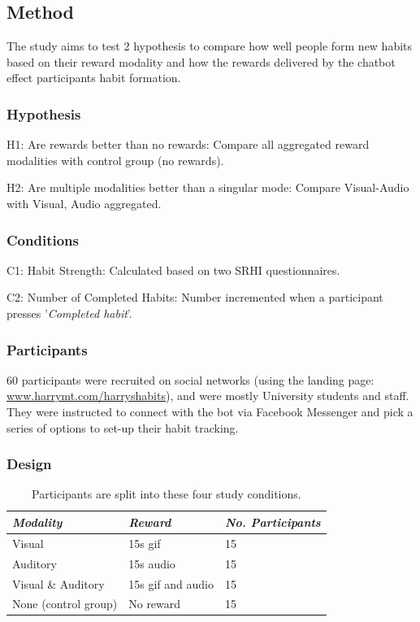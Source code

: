 \documentclass{scaffold/sigchi}
\begin{document}
\subsection{Method}
The study aims to test 2 hypothesis to compare how well people form new habits based on their reward modality and how the rewards delivered by the chatbot effect participants habit formation.

\subsubsection{Hypothesis}
H1: Are rewards better than no rewards: Compare all aggregated reward modalities with control group (no rewards).


H2: Are multiple modalities better than a singular mode: Compare Visual-Audio with Visual, Audio aggregated.

\subsubsection{Conditions}
C1: Habit Strength: Calculated based on two SRHI questionnaires.


C2: Number of Completed Habits: Number incremented when a participant presses '\textit{Completed habit}'.

\subsubsection{Participants}
60 participants were recruited on social networks (using the landing page: \url{www.harrymt.com/harryshabits}), and were mostly University students and staff. They were instructed to connect with the bot via Facebook Messenger and pick a series of options to set-up their habit tracking.



\subsubsection{Design}


\begin{table}
  \centering
  \begin{tabular}{l l l}
    {\small\textit{Modality}} & {\small \textit{Reward}} & {\small \textit{No. Participants}}\\
    \midrule
    Visual & 15s gif & 15 \\
    Auditory & 15s audio & 15 \\
    Visual \& Auditory & 15s gif and audio & 15 \\
    None (control group) & No reward & 15 \\
  \end{tabular}
  \caption{Participants are split into these four study conditions.}~\label{tab:precise_rewards}
\end{table}
\end{document}
